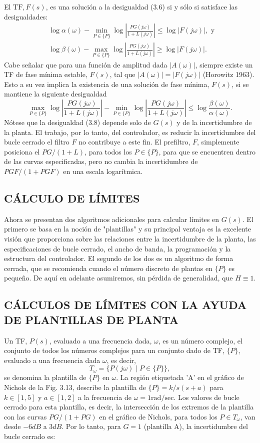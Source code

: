 El $\mathrm{TF}, F(s)$, es una solución a la desigualdad (3.6) si y sólo si satisface las desigualdades:
$$
\begin{aligned}
&\log \alpha(\omega)-\min _{P \in\{P\}} \log \left|\frac{P G(j \omega)}{1+L(j \omega)}\right| \leq \log | F(j \omega)|, \text { y } \\
&\log \beta(\omega)-\max _{P \in\{P\}} \log \left|\frac{P G(j \omega)}{1+L(j \omega)}\right| \geq \log | F(j \omega)| .
\end{aligned}
$$
Cabe señalar que para una función de amplitud dada $ | A(\omega)|$, siempre existe un TF de fase mínima estable, $F(s)$, tal que $| A(\omega)|=| F(j \omega)|$ (Horowitz 1963). Esto a su vez implica la existencia de una solución de fase mínima, $F(s)$, si se mantiene la siguiente desigualdad
$$
\max _{P \in\{P\}} \log \left|\frac{P G(j \omega)}{1+L(j \omega)}\right|-\min _{P \in\{P\}} \log \left|\frac{P G(j \omega)}{1+L(j \omega)}\right| \leq \log \frac{\beta(\omega)}{\alpha(\omega)} .
$$
Nótese que la desigualdad (3.8) depende solo de $G(s)$ y de la incertidumbre de la planta. El trabajo, por lo tanto, del controlador, es reducir la incertidumbre del bucle cerrado el filtro $F$ no contribuye a este fin. El prefiltro, $F$, simplemente posiciona el $P G /(1+L)$, para todos los $P \in\{P\}$, para que se encuentren dentro de las curvas especificadas, pero no cambia la incertidumbre de $P G F /(1+P G F)$ en una escala logarítmica.

\subsection{CÁLCULO DE LÍMITES}
Ahora se presentan dos algoritmos adicionales para calcular límites en $G(s)$. El primero se basa en la noción de "plantillas" y su principal ventaja es la excelente visión que proporciona sobre las relaciones entre la incertidumbre de la planta, las especificaciones de bucle cerrado, el ancho de banda, la programación y la estructura del controlador. El segundo de los dos es un algoritmo de forma cerrada, que se recomienda cuando el número discreto de plantas en $\{P\}$ es pequeño. De aquí en adelante asumiremos, sin pérdida de generalidad, que $H \equiv 1$.

\subsection{CÁLCULOS DE LÍMITES CON LA AYUDA DE PLANTILLAS DE PLANTA}
Un TF, $P(s)$, evaluado a una frecuencia dada, $\omega$, es un número complejo, el conjunto de todos los números complejos para un conjunto dado de TF, $\{P\}$, evaluado a una frecuencia dada $\omega$, es decir,
$$
T_{\omega}=\{P(j \omega) \mid P \in\{P\}\},
$$
se denomina la plantilla de $\{P\}$ en $\omega$. La región etiquetada 'A' en el gráfico de Nichols de la Fig. 3.13, describe la plantilla de $\{P\}=k / s(s+a)$ para $k \in[1,5]$ y $a \in[1,2]$ a la frecuencia de $\omega=1 \mathrm{rad} / \mathrm{sec}$. Los valores de bucle cerrado para esta plantilla, es decir, la intersección de los extremos de la plantilla con las curvas $P G /(1+P G)$ en el gráfico de Nichols, para todos los $P \in T_{\omega}$, van desde $-6 d B$ a $3 d B$. Por lo tanto, para $G=1$ (plantilla A), la incertidumbre del bucle cerrado es:

